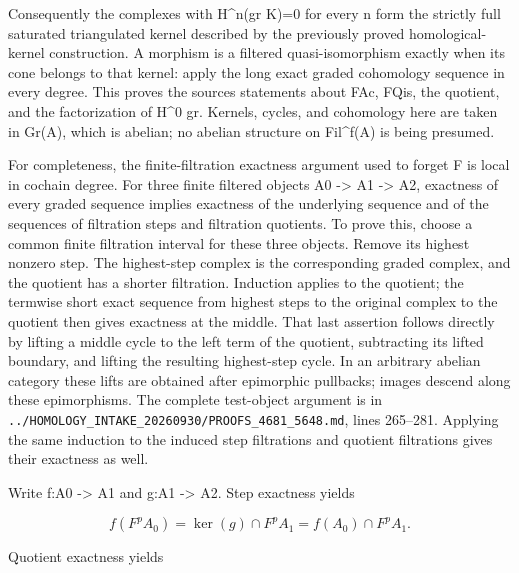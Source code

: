 Consequently the complexes with H\^{}n(gr K)\allowbreak{}\allowbreak{}=0 for every n form the strictly full saturated triangulated kernel described by the previously proved homological-kernel construction. A morphism is a filtered quasi-isomorphism exactly when its cone belongs to that kernel:\allowbreak{} apply the long exact graded cohomology sequence in every degree. This proves the source\textquotesingle s statements about FAc,\allowbreak{} FQis,\allowbreak{} the quotient,\allowbreak{} and the factorization of H\^{}0 gr. Kernels,\allowbreak{} cycles,\allowbreak{} and cohomology here are taken in Gr(A)\allowbreak{},\allowbreak{} which is abelian; no abelian structure on Fil\textasciicircum{}f(A)\allowbreak{} is being presumed.

For completeness,\allowbreak{} the finite-filtration exactness argument used to forget F is local in cochain degree. For three finite filtered objects A0 \allowbreak{}-> A1 \allowbreak{}-> A2,\allowbreak{} exactness of every graded sequence implies exactness of the underlying sequence and of the sequences of filtration steps and filtration quotients. To prove this,\allowbreak{} choose a common finite filtration interval for these three objects. Remove its highest nonzero step. The highest-step complex is the corresponding graded complex,\allowbreak{} and the quotient has a shorter filtration. Induction applies to the quotient; the termwise short exact sequence from highest steps to the original complex to the quotient then gives exactness at the middle. That last assertion follows directly by lifting a middle cycle to the left term of the quotient,\allowbreak{} subtracting its lifted boundary,\allowbreak{} and lifting the resulting highest-step cycle. In an arbitrary abelian category these lifts are obtained after epimorphic pullbacks; images descend along these epimorphisms. The complete test-object argument is in \texttt{.\allowbreak{}.\allowbreak{}/\allowbreak{}HOMOLOGY\_\allowbreak{}INTAKE\_\allowbreak{}20260930/\allowbreak{}PROOFS\_\allowbreak{}4681\_\allowbreak{}5648.\allowbreak{}md},\allowbreak{} lines 265–\allowbreak{}281. Applying the same induction to the induced step filtrations and quotient filtrations gives their exactness as well.

Write f:\allowbreak{}A0 \allowbreak{}-> A1 and g:\allowbreak{}A1 \allowbreak{}-> A2. Step exactness yields

\[
 f(F^p A_0)=\ker(g)\cap F^p A_1=f(A_0)\cap F^p A_1.
\]

Quotient exactness yields

